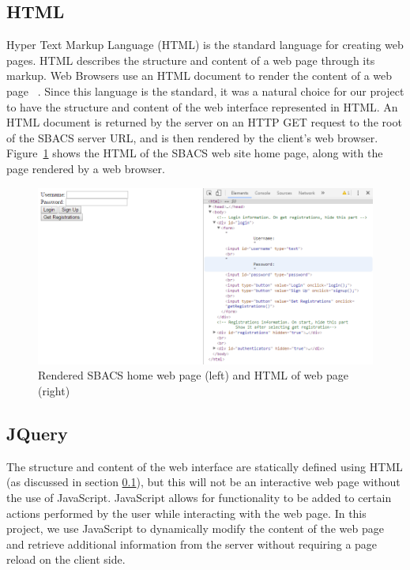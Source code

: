 \documentclass[12pt]{report}
\let\Oldsubsection\subsection
\renewcommand{\subsection}{\FloatBarrier\Oldsubsection}
\begin{document}
\subsection{HTML} \label{html}

Hyper Text Markup Language (HTML) is the standard language for creating web pages. HTML describes the
structure and content of a web page through its markup. Web Browsers use an HTML document to render
the content of a web page ~\autocite{HTMLREF}. Since this language is the standard, it was a natural choice for our
project to have the structure and content of the web interface represented in HTML. An HTML document
is returned by the server on an HTTP GET request to the root of the SBACS server URL, and is then
rendered by the client's web browser. Figure~\ref{fig:home-html} shows the HTML of the SBACS web site
home page, along with the page rendered by a web browser.

\begin{figure}
    \includegraphics[width=\textwidth]{Diagrams/Server_Diagrams/HTML}
    \caption[Comparison of rendered SBACS web page and HTML]{Rendered SBACS home web page (left) and HTML of web page (right)}
    \label{fig:home-html}
\end{figure}

\subsection{JQuery} \label{jquery}

The structure and content of the web interface are statically defined using HTML (as discussed in section \ref{html}), but this will not
be an interactive web page without the use of JavaScript. JavaScript allows for functionality to be
added to certain actions performed by the user while interacting with the web page. In this project,
we use JavaScript to dynamically modify the content of the web page and retrieve additional
information from the server without requiring a page reload on the client side.
\end{document}
